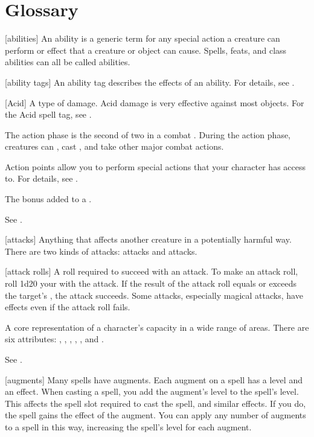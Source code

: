 \chapter{Glossary}\label{Glossary}

[abilities] An ability is a generic term for any special action a creature can perform or effect that a creature or object can cause. Spells, feats, and class abilities can all be called abilities.

[ability tags] An ability tag describes the effects of an ability.
For details, see .

[Acid] A type of damage. Acid damage is very effective against most objects. For the Acid spell tag, see .

 The action phase is the second of two  in a combat .
During the action phase, creatures can , cast , and take other major combat actions.

 Action points allow you to perform special actions that your character has access to.
For details, see .

 The bonus added to a .

 See .

[attacks] Anything that affects another creature in a potentially harmful way. There are two kinds of attacks:  attacks and  attacks.

[attack rolls] A roll required to succeed with an attack.
To make an attack roll, roll 1d20 \add your  with the attack.
If the result of the attack roll equals or exceeds the target's , the attack succeeds.
Some attacks, especially magical attacks, have effects even if the attack roll fails.

 A core representation of a character's capacity in a wide range of areas. There are six attributes: , , , , , and .

 See .

[augments] Many spells have augments.
Each augment on a spell has a level and an effect.
When casting a spell, you add the augment's level to the spell's level.
This affects the spell slot required to cast the spell, and similar effects.
If you do, the spell gains the effect of the augment.
You can apply any number of augments to a spell in this way, increasing the spell's level for each augment.

